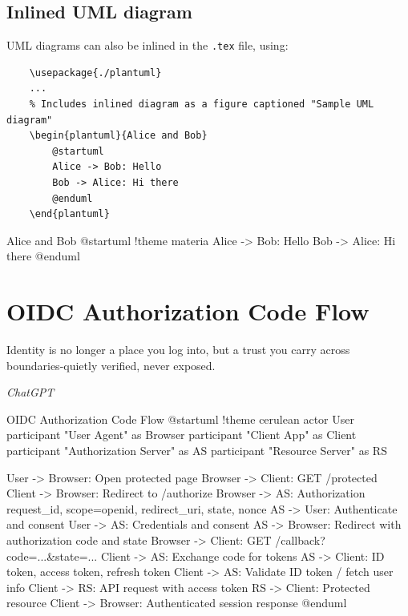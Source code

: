 \documentclass[11pt,parskip=half]{scrartcl}
\begin{document}

\subsection{Inlined UML diagram}

UML diagrams can also be inlined in the \texttt{.tex} file, using:

\begin{verbatim}
    \usepackage{./plantuml}
    ...
    % Includes inlined diagram as a figure captioned "Sample UML diagram"
    \begin{plantuml}{Alice and Bob}
        @startuml
        Alice -> Bob: Hello
        Bob -> Alice: Hi there
        @enduml
    \end{plantuml}
\end{verbatim}

\begin{plantuml}{Alice and Bob}
    @startuml
    !theme materia
    Alice -> Bob: Hello
    Bob -> Alice: Hi there
    @enduml
\end{plantuml}

\section{OIDC Authorization Code Flow}

\epigraph{Identity is no longer a place you log into, but a trust you carry across boundaries-quietly verified, never exposed.}{\textit{ChatGPT}}

\begin{plantuml}{OIDC Authorization Code Flow}
  @startuml
  !theme cerulean
  actor User
  participant "User Agent" as Browser
  participant "Client App" as Client
  participant "Authorization Server" as AS
  participant "Resource Server" as RS

  User -> Browser: Open protected page
  Browser -> Client: GET /protected
  Client -> Browser: Redirect to /authorize
  Browser -> AS: Authorization request\nclient_id, scope=openid, redirect_uri, state, nonce
  AS -> User: Authenticate and consent
  User -> AS: Credentials and consent
  AS -> Browser: Redirect with authorization code and state
  Browser -> Client: GET /callback?code=...&state=...
  Client -> AS: Exchange code for tokens
  AS -> Client: ID token, access token, refresh token
  Client -> AS: Validate ID token / fetch user info
  Client -> RS: API request with access token
  RS -> Client: Protected resource
  Client -> Browser: Authenticated session response
  @enduml
\end{plantuml}
\end{document}

